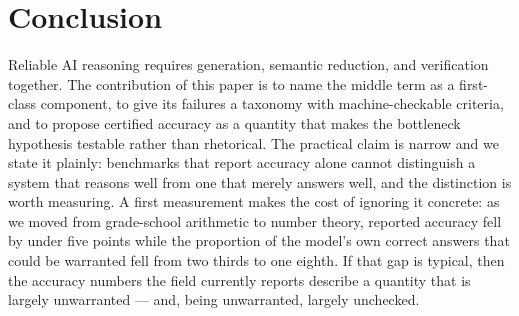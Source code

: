 \documentclass[11pt,a4paper]{article}
\begin{document}
\section{Conclusion}

Reliable AI reasoning requires generation, semantic reduction, and verification
together.  The contribution of this paper is to name the middle term as a
first-class component, to give its failures a taxonomy with machine-checkable
criteria, and to propose certified accuracy as a quantity that makes the
bottleneck hypothesis testable rather than rhetorical.  The practical claim is
narrow and we state it plainly: benchmarks that report accuracy alone cannot
distinguish a system that reasons well from one that merely answers well, and
the distinction is worth measuring.  A first measurement makes the cost of
ignoring it concrete: as we moved from grade-school arithmetic to number theory,
reported accuracy fell by under five points while the proportion of the model's
own correct answers that could be warranted fell from two thirds to one eighth.
If that gap is typical, then the accuracy numbers the field currently reports
describe a quantity that is largely unwarranted --- and, being unwarranted,
largely unchecked.



\end{document}
